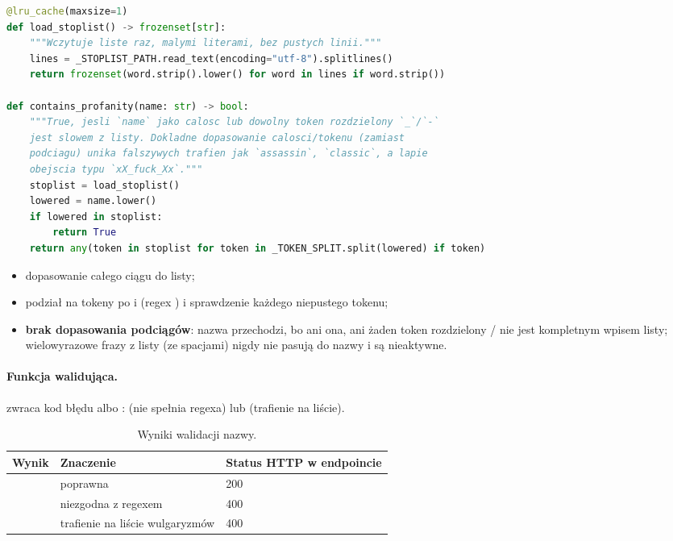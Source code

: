 \begin{lstlisting}[language=Python]
@lru_cache(maxsize=1)
def load_stoplist() -> frozenset[str]:
    """Wczytuje liste raz, malymi literami, bez pustych linii."""
    lines = _STOPLIST_PATH.read_text(encoding="utf-8").splitlines()
    return frozenset(word.strip().lower() for word in lines if word.strip())

def contains_profanity(name: str) -> bool:
    """True, jesli `name` jako calosc lub dowolny token rozdzielony `_`/`-`
    jest slowem z listy. Dokladne dopasowanie calosci/tokenu (zamiast
    podciagu) unika falszywych trafien jak `assassin`, `classic`, a lapie
    obejscia typu `xX_fuck_Xx`."""
    stoplist = load_stoplist()
    lowered = name.lower()
    if lowered in stoplist:
        return True
    return any(token in stoplist for token in _TOKEN_SPLIT.split(lowered) if token)
\end{lstlisting}

\begin{itemize}
  \item dopasowanie całego ciągu do listy;
  \item podział na tokeny po \code{_} i \code{-} (regex \code{[_-]}) i sprawdzenie każdego
        niepustego tokenu;
  \item \textbf{brak dopasowania podciągów}: nazwa  przechodzi, bo ani ona,
        ani żaden token rozdzielony \code{_}/\code{-} nie jest kompletnym wpisem listy;
        wielowyrazowe frazy z listy (ze spacjami) nigdy nie pasują do nazwy i są
        nieaktywne.
\end{itemize}

\paragraph{Funkcja walidująca.}  zwraca kod
błędu albo :  (nie spełnia regexa) lub 
(trafienie na liście).

\begin{table}[H]
\centering\small
\renewcommand{\arraystretch}{1.2}
\begin{tabularx}{\textwidth}{@{}llY@{}}
\toprule
\textbf{Wynik} & \textbf{Znaczenie} & \textbf{Status HTTP w endpoincie} \\
\midrule
{} & poprawna & 200 \\
 & niezgodna z regexem & 400 \\
 & trafienie na liście wulgaryzmów & 400 \\
\bottomrule
\end{tabularx}
\caption{Wyniki walidacji nazwy.}
\end{table}

